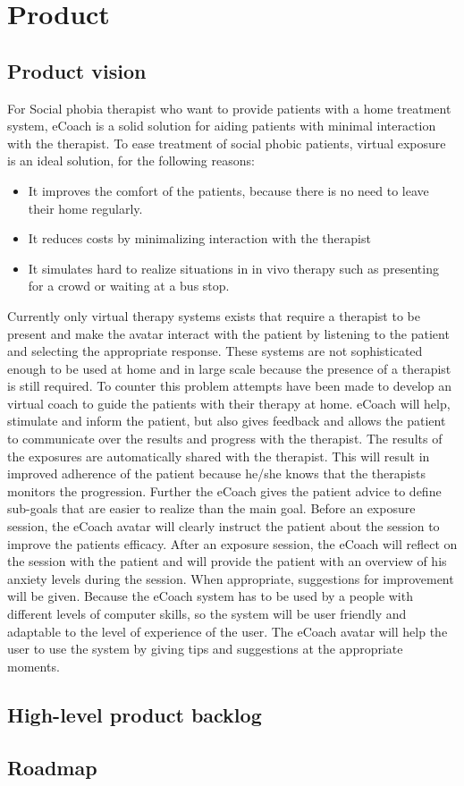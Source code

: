 \chapter{Product}

\section{Product vision}
For Social phobia therapist who want to provide patients with a home treatment system, eCoach is a  solid solution for aiding patients with minimal interaction with the therapist. To ease treatment of social phobic patients, virtual exposure is an ideal solution, for the following reasons:
\begin{itemize}
\item It improves the comfort of the patients, because there is no need to leave their home regularly.
\item It reduces costs by minimalizing interaction with the therapist
\item It simulates hard to realize situations in in vivo therapy such as presenting for a crowd or waiting at a bus stop.
\end{itemize}
Currently only virtual therapy systems exists that require a therapist to be present and make the avatar interact with the patient by listening to the patient and selecting the appropriate response. These systems are not sophisticated enough to be used at home and in large scale because the presence of a therapist is still required. To counter this problem attempts have been made to develop an virtual coach to guide the patients with their therapy at home.
eCoach will help, stimulate and inform the patient, but also gives feedback and allows the patient to communicate over the results and progress with the therapist. The results of the exposures are automatically shared with the therapist. This will result in improved adherence of the patient because he/she knows that the therapists monitors the progression.
Further the eCoach gives the patient advice to define sub-goals that are easier to realize than the main goal. Before an exposure session, the eCoach avatar will clearly instruct the patient about the session to improve the patients efficacy. After an exposure session, the eCoach will reflect on the session with the patient and will provide the patient with an overview of his anxiety levels during the session. When appropriate, suggestions for improvement will be given.
Because the eCoach system has to be used by a people with different levels of computer skills, so the system will be user friendly and adaptable to the level of experience of the user. The eCoach avatar will help the user to use the system by giving tips and suggestions at the appropriate moments.


\section{High-level product backlog}

\section{Roadmap}